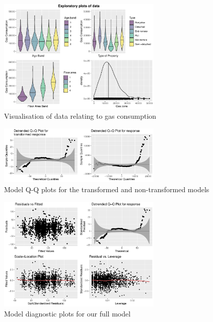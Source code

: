 \documentclass[9pt]{extarticle}
\begin{document}
\begin{figure}[H]
	\centering
	\includegraphics[width=0.7\textwidth]{datavis}
	\caption{Visualisation of data relating to gas consumption}
	\label{fig:datavis}
\end{figure}


\begin{figure}[H]
	\centering
	\includegraphics[width=0.7\textwidth]{qqplots}
	\caption{Model Q-Q plots for the transformed and non-transformed models}
	\label{fig:qqplots}
\end{figure}

\begin{figure}[H]
	\centering
	\includegraphics[width=0.7\textwidth]{fm_diag}
	\caption{Model diagnostic plots for our full model}
	\label{fig:fmdiag}
\end{figure}
\end{document}
